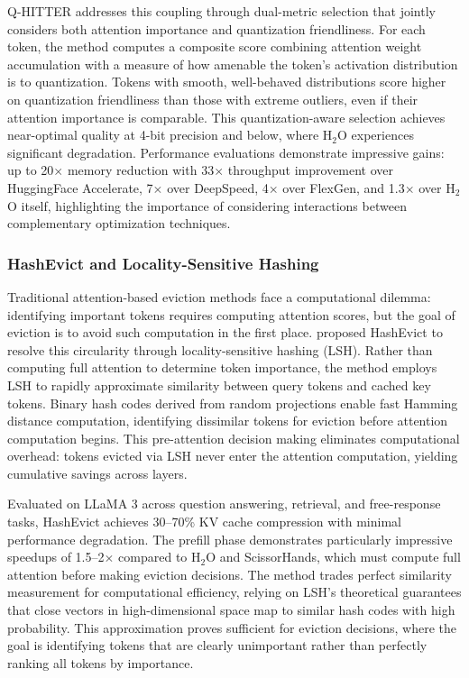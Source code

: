 Q-HITTER addresses this coupling through dual-metric selection that jointly considers both attention importance and quantization friendliness. For each token, the method computes a composite score combining attention weight accumulation with a measure of how amenable the token's activation distribution is to quantization. Tokens with smooth, well-behaved distributions score higher on quantization friendliness than those with extreme outliers, even if their attention importance is comparable. This quantization-aware selection achieves near-optimal quality at 4-bit precision and below, where H$_2$O experiences significant degradation. Performance evaluations demonstrate impressive gains: up to 20$\times$ memory reduction with 33$\times$ throughput improvement over HuggingFace Accelerate, 7$\times$ over DeepSpeed, 4$\times$ over FlexGen, and 1.3$\times$ over H$_2$O itself, highlighting the importance of considering interactions between complementary optimization techniques.

\subsubsection{HashEvict and Locality-Sensitive Hashing}

Traditional attention-based eviction methods face a computational dilemma: identifying important tokens requires computing attention scores, but the goal of eviction is to avoid such computation in the first place. \citet{liu2024hashevict} proposed HashEvict to resolve this circularity through locality-sensitive hashing (LSH). Rather than computing full attention to determine token importance, the method employs LSH to rapidly approximate similarity between query tokens and cached key tokens. Binary hash codes derived from random projections enable fast Hamming distance computation, identifying dissimilar tokens for eviction before attention computation begins. This pre-attention decision making eliminates computational overhead: tokens evicted via LSH never enter the attention computation, yielding cumulative savings across layers.

Evaluated on LLaMA 3 across question answering, retrieval, and free-response tasks, HashEvict achieves 30--70\% KV cache compression with minimal performance degradation. The prefill phase demonstrates particularly impressive speedups of 1.5--2$\times$ compared to H$_2$O and ScissorHands, which must compute full attention before making eviction decisions. The method trades perfect similarity measurement for computational efficiency, relying on LSH's theoretical guarantees that close vectors in high-dimensional space map to similar hash codes with high probability. This approximation proves sufficient for eviction decisions, where the goal is identifying tokens that are clearly unimportant rather than perfectly ranking all tokens by importance.

